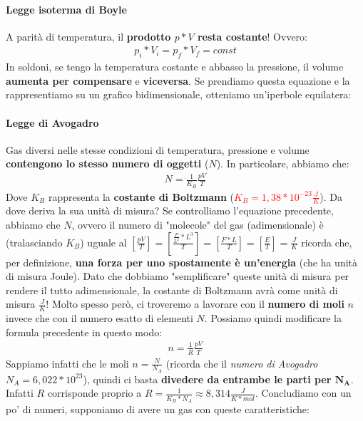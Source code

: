                 \paragraph{Legge isoterma di Boyle}
                    A parità di temperatura, il \textbf{prodotto $p*V$ resta costante}! Ovvero:
                    \begin{align*}
                        p_i*V_i = p_f*V_f = const
                    \end{align*}
                    In soldoni, se tengo la temperatura costante e abbasso la pressione, il volume \textbf{aumenta per compensare} e \textbf{viceversa}. Se prendiamo questa equazione e la rappresentiamo su un grafico bidimensionale, otteniamo un'iperbole equilatera:

                \paragraph{Legge di Avogadro}
                    Gas diversi nelle stesse condizioni di temperatura, pressione e volume \textbf{contengono lo stesso numero di oggetti} ($N$). In particolare, abbiamo che:
                    \begin{align*}
                        N=\frac{1}{K_B}\frac{pV}{T}
                    \end{align*}
                    Dove $K_B$ rappresenta la \textbf{costante di Boltzmann} (\textcolor{Red}{$K_B = 1,38*10^{-23}\frac{J}{K}$}). Da dove deriva la sua unità di misura? Se controlliamo l'equazione precedente, abbiamo che $N$, ovvero il numero di "molecole" del gas (adimensionale) è (tralasciando $K_B$) uguale al $[\frac{pV}{T}] =[\frac{\frac{F}{L^2}*L^3}{T}]=[\frac{F*L}{T}]=[\frac{E}{T}]=\frac{J}{K}$ ricorda che, per definizione, \textbf{una forza per uno spostamente è un'energia} (che ha unità di misura Joule). Dato che dobbiamo "semplificare" queste unità di misura per rendere il tutto adimensionale, la costante di Boltzmann avrà come unità di misura $\frac{J}{K}$!
                    Molto spesso però, ci troveremo a lavorare con il \textbf{numero di moli} $n$ invece che con il numero esatto di elementi $N$. Possiamo quindi modificare la formula precedente in questo modo:
                    \begin{align*}
                        n=\frac{1}{R}\frac{pV}{T}
                    \end{align*}
                    Sappiamo infatti che le moli $n=\frac{N}{N_A}$ (ricorda che il \textit{numero di Avogadro} $N_A=6,022*10^{23}$), quindi ci basta \textbf{divedere da entrambe le parti per $\mathbf{N_A}$}. Infatti $R$ corrisponde proprio a $R=\frac{1}{K_B*N_A}\approx8,314\frac{J}{K*mol}$. Concludiamo con un po' di numeri, supponiamo di avere un gas con queste caratteristiche:
